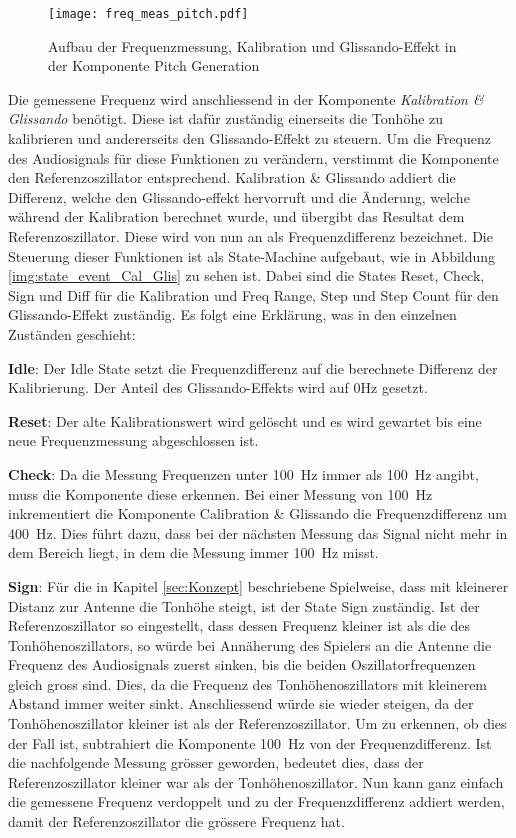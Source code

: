 \begin{figure}[h!]
	\centering
	\texttt{[image: freq\_meas\_pitch.pdf]}
	\caption{Aufbau der Frequenzmessung, Kalibration und Glissando-Effekt in der Komponente Pitch Generation} 
	\label{img:freq_meas_pitch}
\end{figure}  

Die gemessene Frequenz wird anschliessend in der Komponente \textit{Kalibration \& Glissando} benötigt. Diese ist dafür zuständig einerseits die Tonhöhe zu kalibrieren und andererseits den Glissando-Effekt zu steuern. Um die Frequenz des Audiosignals für diese Funktionen zu verändern, verstimmt die Komponente den Referenzoszillator entsprechend. Kalibration \& Glissando addiert die Differenz, welche den Glissando-effekt hervorruft und die Änderung, welche während der Kalibration berechnet wurde, und übergibt das Resultat dem Referenzoszillator. Diese wird von nun an als Frequenzdifferenz bezeichnet. Die Steuerung dieser Funktionen ist als State-Machine aufgebaut, wie in Abbildung \ref{img:state_event_Cal_Glis} zu sehen ist. 
Dabei sind die States Reset, Check, Sign und Diff für die Kalibration und Freq Range, Step und Step Count für den Glissando-Effekt zuständig. Es folgt eine Erklärung, was in den einzelnen Zuständen geschieht:

\textbf{Idle}:
Der Idle State setzt die Frequenzdifferenz auf die berechnete Differenz der Kalibrierung. Der Anteil des Glissando-Effekts wird auf 0Hz gesetzt.

\textbf{Reset}:
Der alte Kalibrationswert wird gelöscht und es wird gewartet bis eine neue Frequenzmessung abgeschlossen ist.

\textbf{Check}:
Da die Messung Frequenzen unter \SI{100}{Hz} immer als \SI{100}{Hz} angibt, muss die Komponente diese erkennen. Bei einer Messung von \SI{100}{Hz} inkrementiert die Komponente Calibration \& Glissando die Frequenzdifferenz um \SI{400}{Hz}. Dies führt dazu, dass bei der nächsten Messung das Signal nicht mehr in dem Bereich liegt, in dem die Messung immer \SI{100}{Hz} misst.

\textbf{Sign}:
Für die in Kapitel \ref{sec:Konzept} beschriebene Spielweise, dass mit kleinerer Distanz zur Antenne die Tonhöhe steigt, ist der State Sign zuständig. Ist der Referenzoszillator so eingestellt, dass dessen Frequenz kleiner ist als die des Tonhöhenoszillators, so würde bei Annäherung des Spielers an die Antenne die Frequenz des Audiosignals zuerst sinken, bis die beiden Oszillatorfrequenzen gleich gross sind. Dies, da die Frequenz des Tonhöhenoszillators mit kleinerem Abstand immer weiter sinkt. Anschliessend würde sie wieder steigen, da der Tonhöhenoszillator kleiner ist als der Referenzoszillator. Um zu erkennen, ob dies der Fall ist, subtrahiert die Komponente \SI{100}{Hz} von der Frequenzdifferenz. Ist die nachfolgende Messung grösser geworden, bedeutet dies, dass der Referenzoszillator kleiner war als der Tonhöhenoszillator. Nun kann ganz einfach die gemessene Frequenz verdoppelt und zu der Frequenzdifferenz addiert werden, damit der Referenzoszillator die grössere Frequenz hat.

